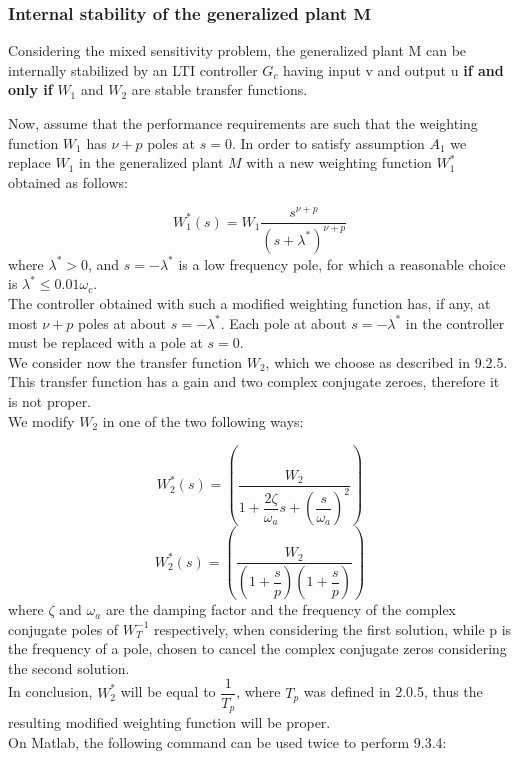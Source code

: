 \documentclass[a4paper,10pt,titlepage]{article}
\numberwithin{equation}{subsection}
\begin{document}
	\subsubsection{Internal stability of the generalized plant $\bm{M}$}
	Considering the mixed sensitivity problem, the generalized plant M can be internally stabilized by an LTI controller $G_c$ having input v and output u \textbf{if and only if} $W_1$ and $W_2$ are stable transfer functions.
	
	\vspace{2pt}
	Now, assume that the performance requirements are such that the weighting function $W_1$ has $\nu+p$ poles at $s=0$. In order to satisfy assumption $A_1$ we replace $W_1$ in the generalized plant $M$ with a new weighting function $W_1^*$ obtained as follows:
	
	\begin{equation}
		W_1^*(s) = W_1 \dfrac{s^{\nu+p}}{(s+\lambda^*)^{\nu+p}}
	\end{equation}
	where $\lambda^* > 0$, and $s=-\lambda^*$ is a low frequency pole, for which a reasonable choice is $\lambda^* \leq 0.01\omega_c$.\\
	The controller obtained with such a modified weighting function has, if any, at most $\nu+p$ poles at about $s=-\lambda^*$. Each pole at about $s=-\lambda^*$ in the controller must be replaced with a pole at $s=0$.\\
	\vspace{2pt}
	We consider now the transfer function $W_2$, which we choose as described in 9.2.5. This transfer function has a gain and two complex conjugate zeroes, therefore it is not proper.\\
	We modify $W_2$ in one of the two following ways:
	
	\begin{equation}
		W_2^*(s) =  \left( \dfrac{W_2}{1+\dfrac{2\zeta}{\omega_a}s+\left(\dfrac{s}{\omega_a}\right)^2} \right)
	\end{equation}
	\begin{equation}
		W_2^*(s) = \left( \dfrac{W_2}{\left( 1+\dfrac{s}{p} \right) \left( 1+\dfrac{s}{p} \right)} \right)
	\end{equation}
	where $\zeta$ and $\omega_a$ are the damping factor and the frequency of the complex conjugate poles of $W_T^{-1}$ respectively, when considering the first solution, while p is the frequency of a pole, chosen to cancel the complex conjugate zeros considering the second solution.\\
	In conclusion, $W_2^*$ will be equal to $\dfrac{1}{T_p}$, where $T_p$ was defined in 2.0.5, thus the resulting modified weighting function will be proper.\\
	\vspace{2pt}
	On Matlab, the following command can be used twice to perform 9.3.4:
	
\end{document}
